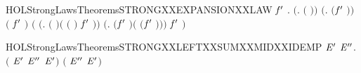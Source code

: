 \begin{SaveVerbatim}{HOLStrongLawsTheoremsSTRONGXXEXPANSIONXXLAW}
\HOLTokenTurnstile{} \HOLSymConst{\HOLTokenForall{}}  \ensuremath{\HOLBoundVar{f}\sp{\prime}} .
       \ensuremath{(}\HOLSymConst{\HOLTokenForall{}}.  \HOLSymConst{\HOLTokenLeq{}}  \HOLSymConst{\HOLTokenImp{}}  \ensuremath{(} \ensuremath{)}\ensuremath{)} \HOLSymConst{\HOLTokenConj{}}
       \ensuremath{(}\HOLSymConst{\HOLTokenForall{}}.  \HOLSymConst{\HOLTokenLeq{}}  \HOLSymConst{\HOLTokenImp{}}  \ensuremath{(}\ensuremath{\HOLBoundVar{f}\sp{\prime}} \ensuremath{)}\ensuremath{)} \HOLSymConst{\HOLTokenImp{}}
        \ensuremath{(}   \HOLSymConst{\ensuremath{\mid}}  \ensuremath{\HOLBoundVar{f}\sp{\prime}} \ensuremath{)}
         \ensuremath{(}
            \ensuremath{(}\HOLTokenLambda{}.  \ensuremath{(} \ensuremath{)}\HOLSymConst{\ensuremath{\ldotp}}\ensuremath{(} \ensuremath{(} \ensuremath{)} \HOLSymConst{\ensuremath{\mid}}  \ensuremath{\HOLBoundVar{f}\sp{\prime}} \ensuremath{)}\ensuremath{)}
             \HOLSymConst{\ensuremath{+}}
            \ensuremath{(}\HOLTokenLambda{}.  \ensuremath{(}\ensuremath{\HOLBoundVar{f}\sp{\prime}} \ensuremath{)}\HOLSymConst{\ensuremath{\ldotp}}\ensuremath{(}   \HOLSymConst{\ensuremath{\mid}}  \ensuremath{(}\ensuremath{\HOLBoundVar{f}\sp{\prime}} \ensuremath{)}\ensuremath{)}\ensuremath{)}
             \HOLSymConst{\ensuremath{+}}    \ensuremath{\HOLBoundVar{f}\sp{\prime}} \ensuremath{)}
\end{SaveVerbatim}
\newcommand{\HOLStrongLawsTheoremsSTRONGXXEXPANSIONXXLAW}{\UseVerbatim{HOLStrongLawsTheoremsSTRONGXXEXPANSIONXXLAW}}
\begin{SaveVerbatim}{HOLStrongLawsTheoremsSTRONGXXLEFTXXSUMXXMIDXXIDEMP}
\HOLTokenTurnstile{} \HOLSymConst{\HOLTokenForall{}} \ensuremath{\HOLBoundVar{E}\sp{\prime}} \ensuremath{\HOLBoundVar{E}\sp{\prime\prime}}.  \ensuremath{(} \HOLSymConst{\ensuremath{+}} \ensuremath{\HOLBoundVar{E}\sp{\prime}} \HOLSymConst{\ensuremath{+}} \ensuremath{\HOLBoundVar{E}\sp{\prime\prime}} \HOLSymConst{\ensuremath{+}} \ensuremath{\HOLBoundVar{E}\sp{\prime}}\ensuremath{)} \ensuremath{(} \HOLSymConst{\ensuremath{+}} \ensuremath{\HOLBoundVar{E}\sp{\prime\prime}} \HOLSymConst{\ensuremath{+}} \ensuremath{\HOLBoundVar{E}\sp{\prime}}\ensuremath{)}
\end{SaveVerbatim}
